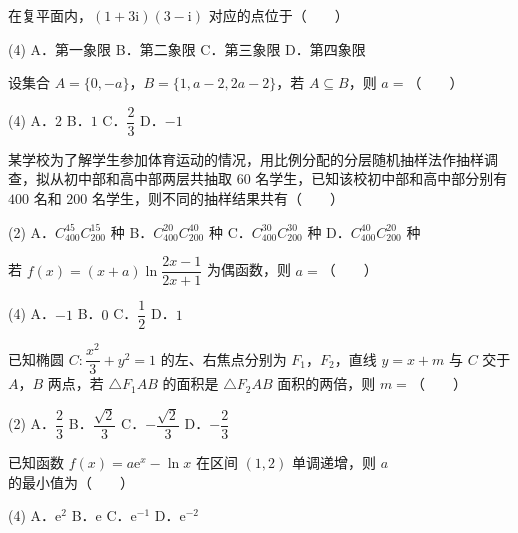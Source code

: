 \begin{question}
在复平面内，$(1+3\mathrm i)(3-\mathrm i)$ 对应的点位于（　　）

\begin{gkopts}(4)
\task A．第一象限
\task B．第二象限
\task C．第三象限
\task D．第四象限
\end{gkopts}

\end{question}
\begin{question}
设集合 $A=\{0,-a\}$，$B=\{1,a-2,2a-2\}$，若 $A\subseteq B$，则 $a=$（　　）

\begin{gkopts}(4)
\task A．$2$
\task B．$1$
\task C．$\dfrac23$
\task D．$-1$
\end{gkopts}

\end{question}
\begin{question}
某学校为了解学生参加体育运动的情况，用比例分配的分层随机抽样法作抽样调查，拟从初中部和高中部两层共抽取 $60$ 名学生，已知该校初中部和高中部分别有 $400$ 名和 $200$ 名学生，则不同的抽样结果共有（　　）

\begin{gkopts}(2)
\task A．$C_{400}^{45}C_{200}^{15}$ 种
\task B．$C_{400}^{20}C_{200}^{40}$ 种
\task C．$C_{400}^{30}C_{200}^{30}$ 种
\task D．$C_{400}^{40}C_{200}^{20}$ 种
\end{gkopts}

\end{question}
\begin{question}
若 $f(x)=(x+a)\ln\dfrac{2x-1}{2x+1}$ 为偶函数，则 $a=$（　　）

\begin{gkopts}(4)
\task A．$-1$
\task B．$0$
\task C．$\dfrac12$
\task D．$1$
\end{gkopts}

\end{question}
\begin{question}
已知椭圆 $C:\dfrac{x^{2}}3+y^{2}=1$ 的左、右焦点分别为 $F_1$，$F_2$，直线 $y=x+m$ 与 $C$ 交于 $A$，$B$ 两点，若 $\triangle F_1AB$ 的面积是 $\triangle F_2AB$ 面积的两倍，则 $m=$（　　）

\begin{gkopts}(2)
\task A．$\dfrac23$
\task B．$\dfrac{\sqrt2}3$
\task C．$-\dfrac{\sqrt2}3$
\task D．$-\dfrac23$
\end{gkopts}

\end{question}
\begin{question}
已知函数 $f(x)=a\mathrm e^{x}-\ln x$ 在区间 $(1,2)$ 单调递增，则 $a$ 的最小值为（　　）

\begin{gkopts}(4)
\task A．$\mathrm e^{2}$
\task B．$\mathrm e$
\task C．$\mathrm e^{-1}$
\task D．$\mathrm e^{-2}$
\end{gkopts}

\end{question}
